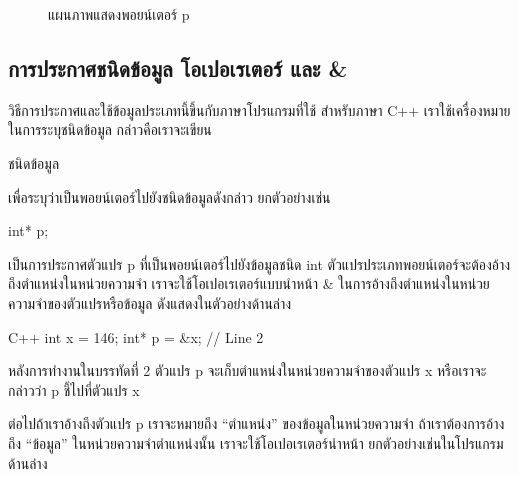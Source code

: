 \begin{figure}
\begin{center}
\end{center}
\caption{แผนภาพ{\wbr}แสดง{\wbr}พอยน์เตอร์ {\ct p}}
\label{fig:array-example-pointer}
\end{figure}

\subsection{การ{\wbr}ประกาศ{\wbr}ชนิด{\wbr}ข้อมูล โอ{\wbr}เปอเรเตอร์ {\ct *} และ {\ct \&}}
วิธีการ{\wbr}ประกาศ{\wbr}และ{\wbr}ใช้{\wbr}ข้อมูล{\wbr}ประเภท{\wbr}นี้{\wbr}ขึ้น{\wbr}กับ{\wbr}ภาษา{\wbr}โปรแกรม{\wbr}ที่{\wbr}ใช้ สำหรับ{\wbr}ภาษา C++
เรา{\wbr}ใช้{\wbr}เครื่องหมาย {\ct *} ใน{\wbr}การ{\wbr}ระบุ{\wbr}ชนิด{\wbr}ข้อมูล กล่าวคือ{\wbr}เรา{\wbr}จะ{\wbr}เขียน{\wbr}

\begin{center}
ชนิด{\wbr}ข้อมูล{\ct *}
\end{center}

เพื่อ{\wbr}ระบุ{\wbr}ว่า{\wbr}เป็น{\wbr}พอยน์เตอร์{\wbr}ไป{\wbr}ยัง{\wbr}ชนิด{\wbr}ข้อมูล{\wbr}ดังกล่าว  ยก{\wbr}ตัวอย่าง{\wbr}เช่น{\wbr}

\begin{center}
{\ct int* p;}
\end{center}

เป็น{\wbr}การ{\wbr}ประกาศ{\wbr}ตัวแปร {\ct p} ที่{\wbr}เป็น{\wbr}พอยน์เตอร์{\wbr}ไป{\wbr}ยัง{\wbr}ข้อมูล{\wbr}ชนิด {\ct int}
ตัวแปร{\wbr}ประเภท{\wbr}พอยน์เตอร์{\wbr}จะ{\wbr}ต้อง{\wbr}อ้าง{\wbr}ถึง{\wbr}ตำแหน่ง{\wbr}ใน{\wbr}หน่วยความจำ{\wbr}
เรา{\wbr}จะ{\wbr}ใช้{\wbr}โอ{\wbr}เปอเรเตอร์{\wbr}แบบ{\wbr}นำหน้า {\ct \&}
ใน{\wbr}การ{\wbr}อ้าง{\wbr}ถึง{\wbr}ตำแหน่ง{\wbr}ใน{\wbr}หน่วยความจำ{\wbr}ของ{\wbr}ตัวแปร{\wbr}หรือ{\wbr}ข้อมูล  ดัง{\wbr}แสดง{\wbr}ใน{\wbr}ตัวอย่าง{\wbr}ด้าน{\wbr}ล่าง{\wbr}

\latintext
\begin{codelist}{C++}{}
int x = 146;
int* p = &x;   // Line 2
\end{codelist}
\thaitext

หลัง{\wbr}การ{\wbr}ทำงาน{\wbr}ใน{\wbr}บรรทัด{\wbr}ที่ 2 ตัวแปร {\ct p} จะ{\wbr}เก็บ{\wbr}ตำแหน่ง{\wbr}ใน{\wbr}หน่วยความจำ{\wbr}ของ{\wbr}ตัวแปร{\wbr}
{\ct x} หรือ{\wbr}เรา{\wbr}จะ{\wbr}กล่าว{\wbr}ว่า {\ct p} ชี้{\wbr}ไป{\wbr}ที่{\wbr}ตัวแปร {\ct x}

ต่อไป{\wbr}ถ้า{\wbr}เรา{\wbr}อ้าง{\wbr}ถึง{\wbr}ตัวแปร {\ct p} เรา{\wbr}จะ{\wbr}หมายถึง ``ตำแหน่ง'' ของ{\wbr}ข้อมูล{\wbr}ใน{\wbr}หน่วยความจำ{\wbr}
ถ้า{\wbr}เรา{\wbr}ต้องการ{\wbr}อ้าง{\wbr}ถึง ``ข้อมูล'' ใน{\wbr}หน่วยความจำ{\wbr}ตำแหน่ง{\wbr}นั้น เรา{\wbr}จะ{\wbr}ใช้{\wbr}โอ{\wbr}เปอเรเตอร์{\wbr}นำหน้า{\wbr}
{\ct *} ยก{\wbr}ตัวอย่าง{\wbr}เช่น{\wbr}ใน{\wbr}โปรแกรม{\wbr}ด้าน{\wbr}ล่าง{\wbr}

